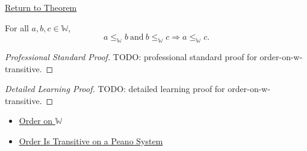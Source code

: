 \newpage
{}
\label{prf:order-on-w-transitive}

\begin{remark*}[Return]
\hyperref[thm:order-on-w-transitive]{Return to Theorem}
\end{remark*}

\begin{theorem*}
For all $a,b,c\in\mathbb{W}$,
\[
a\leq_{\mathbb{W}}b\ \text{and}\ b\leq_{\mathbb{W}}c
\Longrightarrow a\leq_{\mathbb{W}}c.
\]
\end{theorem*}

\begin{proof}[Professional Standard Proof]
\LRAProofBodyStart
TODO: professional standard proof for order-on-w-transitive.
\end{proof}

\begin{proof}[Detailed Learning Proof]
\LRAProofBodyStart
TODO: detailed learning proof for order-on-w-transitive.
\end{proof}

\begin{remark*}
\end{remark*}

\begin{dependencies}
\begin{itemize}
  \item \hyperref[def:order-on-w]{Order on $\mathbb{W}$}
  \item \hyperref[thm:order-transitive-on-peano-system]{Order Is Transitive on a Peano System}
\end{itemize}
\end{dependencies}

\clearpage
